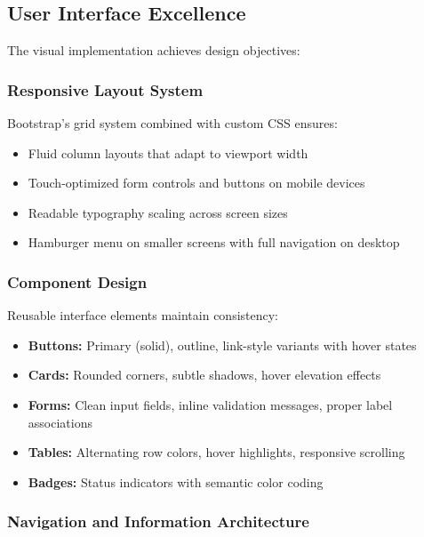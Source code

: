 \documentclass[12pt,a4paper]{article}
\begin{document}
\subsection{User Interface Excellence}

The visual implementation achieves design objectives:

\subsubsection{Responsive Layout System}

Bootstrap's grid system combined with custom CSS ensures:

\begin{itemize}[leftmargin=*]
    \item Fluid column layouts that adapt to viewport width
    \item Touch-optimized form controls and buttons on mobile devices
    \item Readable typography scaling across screen sizes
    \item Hamburger menu on smaller screens with full navigation on desktop
\end{itemize}

\subsubsection{Component Design}

Reusable interface elements maintain consistency:

\begin{itemize}[leftmargin=*]
    \item \textbf{Buttons:} Primary (solid), outline, link-style variants with hover states
    \item \textbf{Cards:} Rounded corners, subtle shadows, hover elevation effects
    \item \textbf{Forms:} Clean input fields, inline validation messages, proper label associations
    \item \textbf{Tables:} Alternating row colors, hover highlights, responsive scrolling
    \item \textbf{Badges:} Status indicators with semantic color coding
\end{itemize}

\subsubsection{Navigation and Information Architecture}
\end{document}
